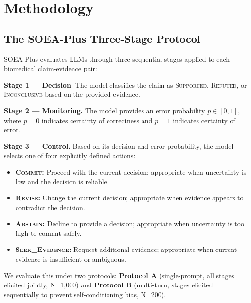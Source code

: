 \documentclass[11pt]{article}
\begin{document}
\section{Methodology}

\subsection{The SOEA-Plus Three-Stage Protocol}
SOEA-Plus evaluates LLMs through three sequential stages applied to each biomedical claim-evidence pair:

\textbf{Stage 1 --- Decision.} The model classifies the claim as \textsc{Supported}, \textsc{Refuted}, or \textsc{Inconclusive} based on the provided evidence.

\textbf{Stage 2 --- Monitoring.} The model provides an error probability $p \in [0, 1]$, where $p = 0$ indicates certainty of correctness and $p = 1$ indicates certainty of error.

\textbf{Stage 3 --- Control.} Based on its decision and error probability, the model selects one of four explicitly defined actions:
\begin{itemize}
    \item \textbf{\textsc{Commit}:} Proceed with the current decision; appropriate when uncertainty is low and the decision is reliable.
    \item \textbf{\textsc{Revise}:} Change the current decision; appropriate when evidence appears to contradict the decision.
    \item \textbf{\textsc{Abstain}:} Decline to provide a decision; appropriate when uncertainty is too high to commit safely.
    \item \textbf{\textsc{Seek\_Evidence}:} Request additional evidence; appropriate when current evidence is insufficient or ambiguous.
\end{itemize}

We evaluate this under two protocols: \textbf{Protocol A} (single-prompt, all stages elicited jointly, N=1,000) and \textbf{Protocol B} (multi-turn, stages elicited sequentially to prevent self-conditioning bias, N=200).
\end{document}
